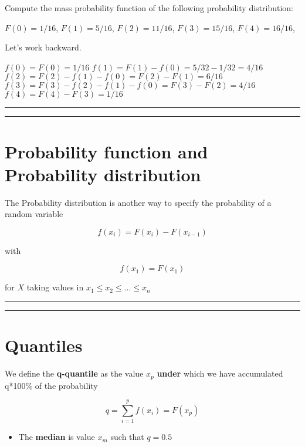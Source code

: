 \documentclass[
]{book}
\providecommand{\tightlist}{%
  \setlength{\itemsep}{0pt}\setlength{\parskip}{0pt}}
\begin{document}
Compute the mass probability function of the following probability distribution:

\(F(0)=1/16\), \(F(1)=5/16\), \(F(2)=11/16\), \(F(3)=15/16\), \(F(4)=16/16\),

Let's work backward.

\(f(0)=F(0)=1/16\)
\(f(1)=F(1)-f(0)=5/32-1/32=4/16\)
\(f(2)=F(2)-f(1)-f(0)=F(2)-F(1)=6/16\)
\(f(3)=F(3)-f(2)-f(1)-f(0)=F(3)-F(2)=4/16\)
\(f(4)=F(4)-F(3)=1/16\)

\begin{center}\rule{0.5\linewidth}{0.5pt}\end{center}

\begin{center}\rule{0.5\linewidth}{0.5pt}\end{center}

\hypertarget{probability-function-and-probability-distribution-1}{%
\section{Probability function and Probability distribution}\label{probability-function-and-probability-distribution-1}}

The Probability distribution is another way to specify the probability of a random variable

\[f(x_i)=F(x_i)-F(x_{i-1})\]

with

\[f(x_1)=F(x_1)\]

for \(X\) taking values in \(x_1 \leq x_2 \leq ... \leq x_n\)

\begin{center}\rule{0.5\linewidth}{0.5pt}\end{center}

\begin{center}\rule{0.5\linewidth}{0.5pt}\end{center}

\hypertarget{quantiles}{%
\section{Quantiles}\label{quantiles}}

We define the \textbf{q-quantile} as the value \(x_{p}\) \textbf{under} which we have accumulated q*100\% of the probability

\[q=\sum_{i=1}^p f(x_i) = F (x_p)\]

\begin{itemize}
\tightlist
\item
  The \textbf{median} is value \(x_m\) such that \(q=0.5\)
\end{itemize}
\end{document}
